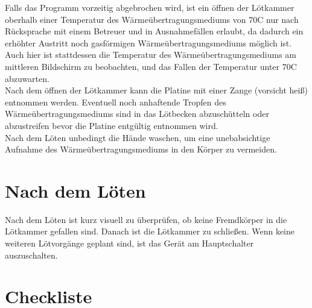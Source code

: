 \documentclass{\basedir/fablab-document}
\begin{document}
Falls das Programm vorzeitig abgebrochen wird, ist ein {\"o}ffnen der L{\"o}tkammer oberhalb einer Temperatur des W{\"a}rme{\"u}bertragungsmediums von 70\textdegree C nur nach R{\"u}cksprache mit einem Betreuer und in Ausnahmef{\"a}llen erlaubt, da dadurch ein erh{\"o}hter Austritt noch gasf{\"o}rmigen W{\"a}rme{\"u}bertragungsmediums m{\"o}glich ist. Auch hier ist stattdessen die Temperatur des W{\"a}rme{\"u}bertragungsmediums am mittleren Bildschirm zu beobachten, und das Fallen der Temperatur unter 70\textdegree C abzuwarten.\\

Nach dem {\"o}ffnen der L{\"o}tkammer kann die Platine mit einer Zange (vorsicht hei{\ss}) entnommen werden. Eventuell noch anhaftende Tropfen des W{\"a}rme{\"u}bertragungsmediums sind in das L{\"o}tbecken abzusch{\"u}tteln oder abzustreifen bevor die Platine entg{\"u}ltig entnommen wird.\\

Nach dem L{\"o}ten unbedingt die H{\"a}nde waschen, um eine unebabsichtige Aufnahme des W{\"a}rme{\"u}bertragungsmediums in den K{\"o}rper zu vermeiden.

\section{Nach dem L{\"o}ten}

Nach dem L{\"o}ten ist kurz visuell zu {\"u}berpr{\"u}fen, ob keine Fremdk{\"o}rper in die L{\"o}tkammer gefallen sind. Danach ist die L{\"o}tkammer zu schlie{\ss}en. Wenn keine weiteren L{\"o}tvorg{\"a}nge geplant sind, ist das Ger{\"a}t am Hauptschalter auszuschalten.
	\newpage
	\section{Checkliste}
\end{document}
